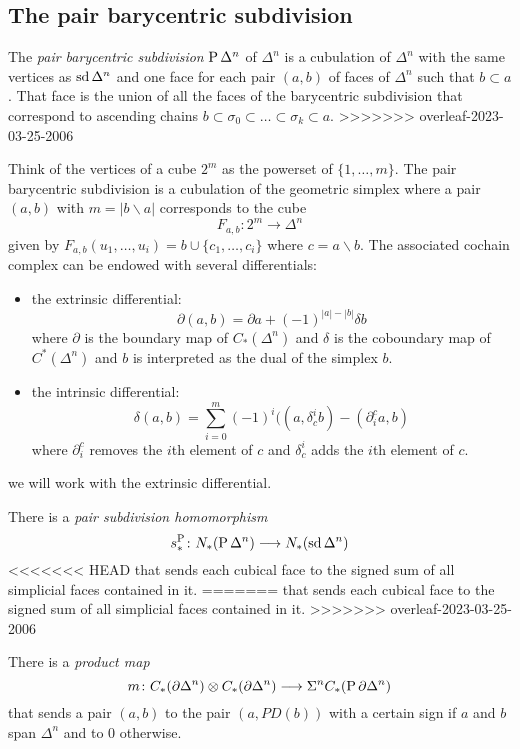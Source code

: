 \subsection{The pair barycentric subdivision} The \emph{pair barycentric subdivision} $\operatorname{P} \Delta^n$ of $\Delta^n$ is a cubulation of $\Delta^n$ with the same vertices as $\operatorname{sd} \Delta^n$ and one face for each pair $(a,b)$ of faces of $\Delta^n$ such that $b\subset a$. That face is the union of all the faces of the barycentric subdivision that correspond to ascending chains $b\subset \sigma_0\subset \ldots\subset \sigma_k\subset a$. 
>>>>>>> overleaf-2023-03-25-2006

Think of the vertices of a cube $2^m$ as the powerset of $\{1,\ldots,m\}$. The pair barycentric subdivision is a cubulation of the geometric simplex where a pair $(a,b)$ with $m=|b\smallsetminus a|$ corresponds to the cube
\[F_{a,b}\colon 2^{m}\to \Delta^n\]
given by $F_{a,b}(u_1,\ldots,u_i) = b\cup \{c_1,\ldots,c_i\}$ where $c=a\smallsetminus b$. The associated cochain complex can be endowed with several differentials:
\begin{itemize}
\item the extrinsic differential:
\[\partial(a,b) = \partial a + (-1)^{|a|-|b|} \delta b\]
where $\partial$ is the boundary map of $C_*(\Delta^n)$ and $\delta$ is the coboundary map of $C^*(\Delta^n)$ and $b$ is interpreted as the dual of the simplex $b$.
\item the intrinsic differential:
\[\delta(a,b) = \sum_{i=0}^m (-1)^i((a,\delta^i_c b)-(\partial^c_i a,b)\]
where $\partial_i^c$ removes the $i$th element of $c$ and $\delta^i_c$ adds the $i$th element of $c$.
\end{itemize}
we will work with the extrinsic differential.

There is a \emph{pair subdivision homomorphism}
\[s_*^{\operatorname{P}}\colon N_*(\operatorname{P} \Delta^n)\longrightarrow N_*(\operatorname{sd} \Delta^n)\]
<<<<<<< HEAD
that sends each cubical face to the signed sum of all simplicial faces contained in it.
=======
that sends each cubical face to the signed sum of all simplicial faces contained in it. 
>>>>>>> overleaf-2023-03-25-2006

There is a \emph{product map}
\[m\colon C_*(\partial \Delta^n)\otimes C_*(\partial \Delta^n)\longrightarrow \Sigma^n C_*(\operatorname{P} \partial \Delta^n) \]
that sends a pair $(a,b)$ to the pair $(a,PD(b))$ with a certain sign if $a$ and $b$ span $\Delta^n$ and to $0$ otherwise.

